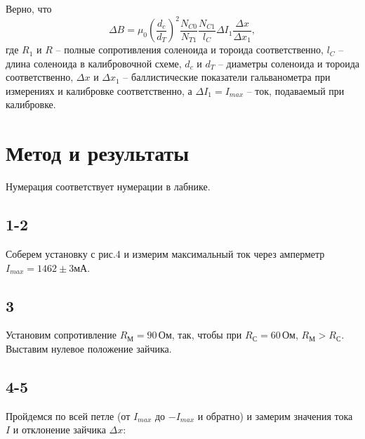 Верно, что
$$\Delta B = \mu_0 \left(\frac{d_c}{d_T}\right)^2\frac{N_{C0}}{N_{T1}}\frac{N_{C1}}{l_C}\Delta I_1 \frac{\Delta x}{\Delta x_1},$$
где $R_1$ и $R$ -- полные сопротивления соленоида и тороида соответственно, $l_C$ -- длина соленоида в калибровочной схеме, $d_c$ и $d_T$ -- диаметры соленоида и тороида соответственно, $\Delta x$ и $\Delta x_1$ -- баллистические показатели гальванометра при измерениях и калибровке соответственно, а $\Delta I_1=I_{max}$ -- ток, подаваемый при калибровке.
\section*{Метод и результаты}
Нумерация соответствует нумерации в лабнике.
\subsection*{1-2}
Соберем установку с рис.4 и измерим максимальный ток через амперметр $I_{max}=1462\pm3 \text{мА}$.
\subsection*{3}
Установим сопротивление $R_\text{М} = 90\,\text{Ом}$, так, чтобы при $R_\text{С} = 60\,\text{Ом}$, $R_\text{М}>R_\text{С}$. Выставим нулевое положение зайчика.
\subsection*{4-5}
Пройдемся по всей петле (от $I_{max}$ до $-I_{max}$ и обратно) и замерим значения тока $I$ и отклонение зайчика $\Delta x$:

